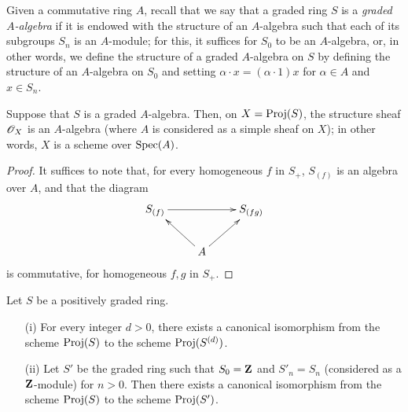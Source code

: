 \begin{env}[2.4.5]
\label{II.2.4.5}
Given a commutative ring $A$, recall that we say that a graded ring $S$ is a \emph{graded $A$-algebra} if it is endowed with the structure of an $A$-algebra such that each of its subgroups $S_n$ is an $A$-module;
for this, it suffices for $S_0$ to be
an $A$-algebra, or, in other words, we define the structure of a graded $A$-algebra on $S$ by defining the structure of an $A$-algebra on $S_0$ and setting $\alpha\cdot x=(\alpha\cdot1)x$ for $\alpha\in A$ and $x\in S_n$.
\end{env}

\begin{proposition}[2.4.6]
\label{II.2.4.6}
Suppose that $S$ is a graded $A$-algebra.
Then, on $X=\operatorname{Proj}(S)$, the structure sheaf $\mathscr{O}_X$ is an $A$-algebra (where $A$ is considered as a simple sheaf on $X$);
in other words, $X$ is a scheme over $\operatorname{Spec}(A)$.
\end{proposition}

\begin{proof}
It suffices to note that, for every homogeneous $f$ in $S_+$, $S_{(f)}$ is an algebra over $A$, and that the diagram
\[
  \xymatrix{
    S_{(f)} \ar[rr] && S_{(fg)}
  \\ & A \ar[ul] \ar[ur] &
  }
\]
is commutative, for homogeneous $f,g$ in $S_+$.
\end{proof}

\begin{proposition}[2.4.7]
\label{II.2.4.7}
Let $S$ be a positively graded ring.
\begin{enumerate}
  \item[{\rm(i)}] For every integer $d>0$, there exists a canonical isomorphism from the scheme $\operatorname{Proj}(S)$ to the scheme $\operatorname{Proj}(S^{(d)})$.
  \item[{\rm(ii)}] Let $S'$ be the graded ring such that $S_0=\mathbf{Z}$ and $S'_n=S_n$ (considered as a $\mathbf{Z}$-module) for $n>0$.
    Then there exists a canonical isomorphism from the scheme $\operatorname{Proj}(S)$ to the scheme $\operatorname{Proj}(S')$.
\end{enumerate}
\end{proposition}

